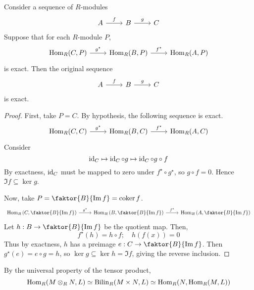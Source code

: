 \begin{lemma}
    Consider a sequence of \( R \)-modules
    \[\begin{tikzcd}
        A & B & C
        \arrow["f", from=1-1, to=1-2]
        \arrow["g", from=1-2, to=1-3]
    \end{tikzcd}\]
    Suppose that for each \( R \)-module \( P \),
    \[\begin{tikzcd}
        {\Hom_R(C, P)} & {\Hom_R(B, P)} & {\Hom_R(A, P)}
        \arrow["{g^\star}", from=1-1, to=1-2]
        \arrow["{f^\star}", from=1-2, to=1-3]
    \end{tikzcd}\]
    is exact.
    Then the original sequence
    \[\begin{tikzcd}
        A & B & C
        \arrow["f", from=1-1, to=1-2]
        \arrow["g", from=1-2, to=1-3]
    \end{tikzcd}\]
    is exact.
\end{lemma}
\begin{proof}
    First, take \( P = C \).
    By hypothesis, the following sequence is exact.
    \[\begin{tikzcd}
        {\Hom_R(C, C)} & {\Hom_R(B, C)} & {\Hom_R(A, C)}
        \arrow["{g^\star}", from=1-1, to=1-2]
        \arrow["{f^\star}", from=1-2, to=1-3]
    \end{tikzcd}\]
    Consider
    \[ \operatorname{id}_C \mapsto \operatorname{id}_C \circ g \mapsto \operatorname{id}_C \circ g \circ f \]
    By exactness, \( \operatorname{id}_C \) must be mapped to zero under \( f^\star \circ g^\star \), so \( g \circ f = 0 \).
    Hence \( \Im f \subseteq \ker g \).

    Now, take \( P = \faktor{B}{\Im f} = \coker f \).
    \[\begin{tikzcd}
        {\Hom_R\qty(C, \faktor{B}{\Im f})} & {\Hom_R\qty(B, \faktor{B}{\Im f})} & {\Hom_R\qty(A, \faktor{B}{\Im f})}
        \arrow["{g^\star}", from=1-1, to=1-2]
        \arrow["{f^\star}", from=1-2, to=1-3]
    \end{tikzcd}\]
    Let \( h : B \to \faktor{B}{\Im f} \) be the quotient map.
    Then,
    \[ f^\star(h) = h \circ f;\quad h(f(x)) = 0 \]
    Thus by exactness, \( h \) has a preimage \( e : C \to \faktor{B}{\Im f} \).
    Then \( g^\star(e) = e \circ g = h \), so \( \ker g \subseteq \ker h = \Im f \), giving the reverse inclusion.
\end{proof}
By the universal property of the tensor product,
\[ \operatorname{Hom}_R(M \otimes_R N, L) \simeq \operatorname{Bilin}_R(M \times N, L) \simeq \operatorname{Hom}_R(N, \operatorname{Hom}_R(M, L)) \]
